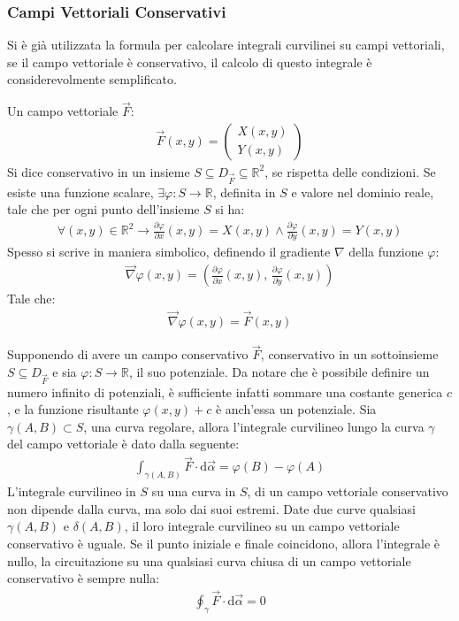 \documentclass{article}
\newcommand{\df}{\mathrm{d}}
\numberwithin{equation}{subsection}
\begin{document}
\subsubsection{Campi Vettoriali Conservativi}

Si è già utilizzata la formula per calcolare integrali curvilinei su campi vettoriali, se il campo vettoriale è conservativo, il calcolo di questo integrale è considerevolmente semplificato. 

Un campo vettoriale $\vec{F}$:
\begin{gather*}
    \vec{F}(x,y)=\begin{pmatrix}
        X(x,y)\\Y(x,y)
    \end{pmatrix}
\end{gather*}
Si dice conservativo in un insieme $S\subseteq D_{\vec{F}}\subseteq\mathbb{R}^2$, se rispetta delle condizioni. 
Se esiste una funzione scalare, $\exists\varphi: S\to\mathbb{R}$, definita in $S$ e valore nel dominio reale, tale che per ogni punto dell'insieme $S$ si ha:
\begin{gather*}
    \forall(x,y)\in\mathbb{R}^2\to\displaystyle\frac{\partial \varphi}{\partial x}(x,y)=X(x,y)\land\frac{\partial \varphi}{\partial y}(x,y)=Y(x,y)
\end{gather*}
Spesso si scrive in maniera simbolico, definendo il gradiente $\nabla$ della funzione $\varphi$:
\begin{gather*}
    \vec{\nabla}\varphi(x,y)=\left(\frac{\partial\varphi}{\partial x}(x,y),\,\frac{\partial\varphi}{\partial y}(x,y)\right)
\end{gather*}
Tale che:
\begin{gather*}
    \vec{\nabla}\varphi(x,y)=\vec{F}(x,y)
\end{gather*}



Supponendo di avere un campo conservativo $\vec{F}$, conservativo in un sottoinsieme $S\subseteq D_{\vec{F}}$ e sia $\varphi:S\to\mathbb{R}$, il suo potenziale. Da notare che è possibile definire un numero infinito di potenziali, è sufficiente infatti sommare una costante generica $c$, e la funzione risultante $\varphi(x,y)+c$ è anch'essa un potenziale. 
Sia $\gamma(A,B)\subset S$, una curva regolare, allora l'integrale curvilineo lungo la curva $\gamma$ del campo vettoriale è dato dalla seguente:
\begin{gather*}
    \int_{\gamma(A,B)}\vec{F}\cdot\df\vec{\alpha}=\varphi(B)-\varphi(A)
\end{gather*}
L'integrale curvilineo in $S$ su una curva in $S$, di un campo vettoriale conservativo non dipende dalla curva, ma solo dai suoi estremi. Date due curve qualsiasi $\gamma(A,B)$ e $\delta(A,B)$, il loro integrale curvilineo su un campo vettoriale conservativo è uguale. 
Se il punto iniziale e finale coincidono, allora l'integrale è nullo, la circuitazione su una qualsiasi curva chiusa di un campo vettoriale conservativo è sempre nulla:
\begin{gather*}
    \oint_{\gamma}\vec{F}\cdot\df\vec{\alpha}=0
\end{gather*}
\end{document}
